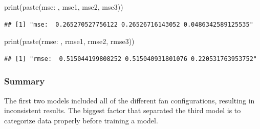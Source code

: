 \documentclass[
]{article}
\newenvironment{Shaded}{\begin{snugshade}}{\end{snugshade}}
\newcommand{\FunctionTok}[1]{\textcolor[rgb]{0.00,0.00,0.00}{#1}}
\newcommand{\NormalTok}[1]{#1}
\newcommand{\StringTok}[1]{\textcolor[rgb]{0.31,0.60,0.02}{#1}}
\begin{document}
\begin{Shaded}
\begin{Highlighting}[]
\FunctionTok{print}\NormalTok{(}\FunctionTok{paste}\NormalTok{(}\StringTok{\textquotesingle{}mse: \textquotesingle{}}\NormalTok{, mse1, mse2, mse3))}
\end{Highlighting}
\end{Shaded}

\begin{verbatim}
## [1] "mse:  0.265270527756122 0.26526716143052 0.0486342589125535"
\end{verbatim}

\begin{Shaded}
\begin{Highlighting}[]
\FunctionTok{print}\NormalTok{(}\FunctionTok{paste}\NormalTok{(}\StringTok{\textquotesingle{}rmse: \textquotesingle{}}\NormalTok{, rmse1, rmse2, rmse3))}
\end{Highlighting}
\end{Shaded}

\begin{verbatim}
## [1] "rmse:  0.515044199808252 0.515040931801076 0.220531763953752"
\end{verbatim}

\hypertarget{summary}{%
\subsubsection{Summary}\label{summary}}

The first two models included all of the different fan configurations,
resulting in inconsistent results. The biggest factor that separated the
third model is to categorize data properly before training a model.
\end{document}

